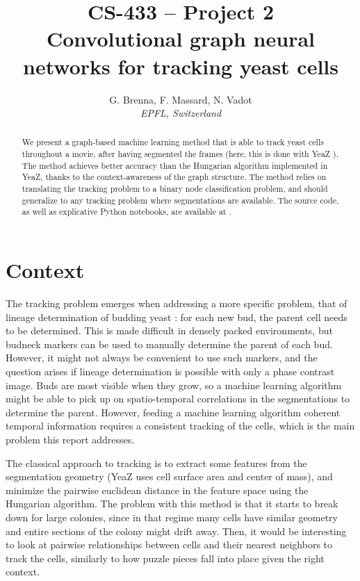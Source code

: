 \documentclass[10pt,conference,compsocconf,a4paper]{IEEEtran}
\begin{document}
\title{CS-433 -- Project 2\\Convolutional graph neural networks for tracking yeast cells}

\author{
	G. Brenna, F. Massard, N. Vadot\\
	\textit{EPFL, Switzerland}
}

\maketitle

\begin{abstract}
	We present a graph-based machine learning method that is able to track yeast cells throughout a movie, after having segmented the frames (here, this is done with YeaZ \cite{dietler_convolutional_2020}). The method achieves better accuracy than the Hungarian algorithm implemented in YeaZ, thanks to the context-awareness of the graph structure. The method relies on translating the tracking problem to a binary node classification problem, and should generalize to any tracking problem where segmentations are available. The source code, as well as explicative Python notebooks, are available at \cite{vadot_cs-433_2021}.
\end{abstract}


\section{Context}

	The tracking problem emerges when addressing a more specific problem, that of lineage determination of budding yeast : for each new bud, the parent cell needs to be determined. This is made difficult in densely packed environments, but budneck markers can be used to manually determine the parent of each bud. However, it might not always be convenient to use such markers, and the question arises if lineage determination is possible with only a phase contrast image. Buds are most visible when they grow, so a machine learning algorithm might be able to pick up on spatio-temporal correlations in the segmentations to determine the parent. However, feeding a machine learning algorithm coherent temporal information requires a consistent tracking of the cells, which is the main problem this report addresses.

	The classical approach to tracking is to extract some features from the segmentation geometry (YeaZ uses cell surface area and center of mass), and minimize the pairwise euclidean distance in the feature space using the Hungarian algorithm. The problem with this method is that it starts to break down for large colonies, since in that regime many cells have similar geometry and entire sections of the colony might drift away. Then, it would be interesting to look at pairwise relationships between cells and their nearest neighbors to track the cells, similarly to how puzzle pieces fall into place given the right context.
\end{document}
